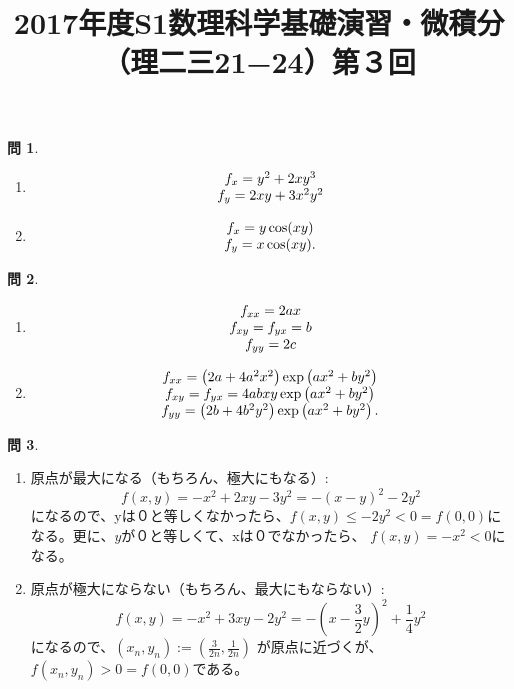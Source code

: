 \documentclass[12pt]{article} %
\title{2017年度S1数理科学基礎演習・微積分（理二三21−24）第３回}
\theoremstyle{definition}
\newtheorem{question}{問}
\begin{document}
\maketitle
\begin{question}
	\begin{enumerate}[(1)]
		\item \begin{equation*}
				\begin{array}[]{c}
					f_x=y^2+2xy^3\\
					f_y=2xy+3x^2y^2
				\end{array}
			\end{equation*}
		\item \begin{equation*}
				\begin{array}[]{c}
					f_x=y\cos(xy)\\
					f_y=x\cos(xy).
				\end{array}
			\end{equation*}
	\end{enumerate}
\end{question}
\begin{question}
	\begin{enumerate}[(1)]
		\item \begin{equation*}
				\begin{array}[]{c}
					f_{xx}=2ax\\
					f_{xy}=f_{yx}=b\\
					f_{yy}=2c
				\end{array}
			\end{equation*}
		\item\begin{equation*}
				\begin{array}[]{c}
					f_{xx}=\left( 2a+4a^2x^2 \right)\exp\left( ax^2+by^2 \right)\\
					f_{xy}=f_{yx}= 4abxy\exp\left( ax^2+by^2 \right)\\
					f_{yy}=\left( 2b+4b^2y^2 \right)\exp\left(  ax^2+by^2\right).
				\end{array}
			\end{equation*}
	\end{enumerate}
\end{question}
\begin{question}
	\begin{enumerate}[(1)]
		\item 原点が最大になる（もちろん、極大にもなる）:\begin{equation*}
				f(x,y)=-x^2+2xy-3y^2=-(x-y)^2-2y^2
			\end{equation*}
			になるので、yは０と等しくなかったら、$f(x,y)\le-2y^2<0=f(0,0)$になる。更に、$y$が０と等しくて、xは０でなかったら、
			$f(x,y)=-x^2<0$になる。
		\item 原点が極大にならない（もちろん、最大にもならない）:\begin{equation*}
				f(x,y)=-x^2+3xy-2y^2=-\left( x-\frac{3}{2}y \right)^2+\frac{1}{4}y^2
			\end{equation*}
			になるので、$(x_n,y_n):=\left( \frac{3}{2n},\frac{1}{2n} \right)$ が原点に近づくが、$f(x_n,y_n)>0=f(0,0)$である。
	\end{enumerate}
\end{question}
\end{document}
